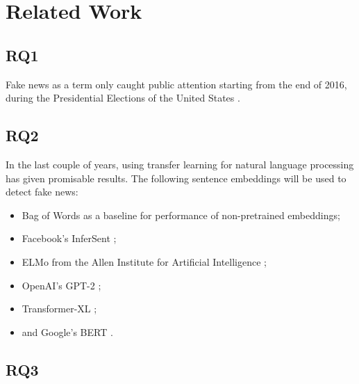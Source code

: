 \section{Related Work}
\label{sec:rel}

\subsection{RQ1}
Fake news as a term only caught public attention starting from the end of 2016, during the Presidential Elections of the United States \cite{googletrends2019}.   

\subsection{RQ2}
In the last couple of years, using transfer learning for natural language processing has given promisable results. The following sentence embeddings will be used to detect fake news:

\begin{itemize}
    \item Bag of Words as a baseline for performance of non-pretrained embeddings;
    \item Facebook's InferSent \cite{conneau2017};
    \item ELMo from the Allen Institute for Artificial Intelligence \cite{peters2018};
    \item OpenAI's GPT-2 \cite{radford2019};
    \item Transformer-XL \cite{dai2019};
    \item and Google's BERT \cite{devlin2018}.
\end{itemize}

\subsection{RQ3}